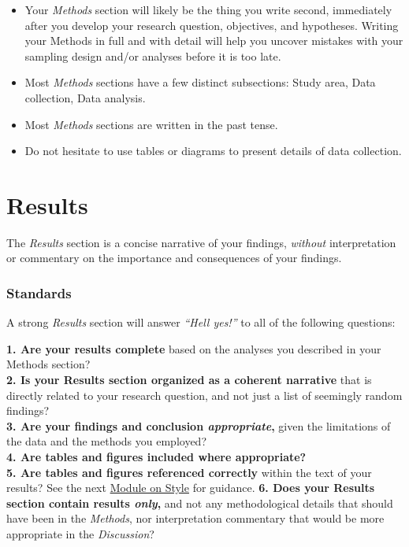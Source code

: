 \documentclass[
]{book}
\begin{document}
\begin{itemize}
\item
  Your \emph{Methods} section will likely be the thing you write second, immediately after you develop your research question, objectives, and hypotheses. Writing your Methods in full and with detail will help you uncover mistakes with your sampling design and/or analyses before it is too late.
\item
  Most \emph{Methods} sections have a few distinct subsections: Study area, Data collection, Data analysis.
\item
  Most \emph{Methods} sections are written in the past tense.
\item
  Do not hesitate to use tables or diagrams to present details of data collection.
\end{itemize}

\hypertarget{results}{%
\section*{Results}\label{results}}

The \emph{Results} section is a concise narrative of your findings, \emph{without} interpretation or commentary on the importance and consequences of your findings.

\hypertarget{standards-3}{%
\subsubsection*{Standards}\label{standards-3}}

A strong \emph{Results} section will answer \emph{``Hell yes!''} to all of the following questions:

\textbf{1. Are your results complete} based on the analyses you described in your Methods section?\\
\textbf{2. Is your Results section organized as a coherent narrative} that is directly related to your research question, and not just a list of seemingly random findings?\\
\textbf{3. Are your findings and conclusion \emph{appropriate},} given the limitations of the data and the methods you employed?\\
\textbf{4. Are tables and figures included where appropriate?}\\
\textbf{5. Are tables and figures referenced correctly} within the text of your results? See the next \protect\hyperlink{style}{Module on Style} for guidance.
\textbf{6. Does your Results section contain results \emph{only},} and not any methodological details that should have been in the \emph{Methods}, nor interpretation commentary that would be more appropriate in the \emph{Discussion}?
\end{document}
